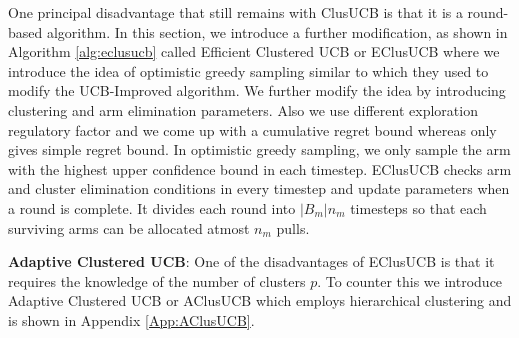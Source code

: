 One principal disadvantage that still remains with ClusUCB is that it is a round-based algorithm. %
In this section, we introduce a further modification,  as shown in Algorithm \ref{alg:eclusucb} called Efficient Clustered UCB or EClusUCB where we introduce the idea of optimistic greedy sampling similar to \cite{liu2016modification} which they used to modify the UCB-Improved algorithm. We further modify the idea by introducing clustering and arm elimination parameters. Also we use different exploration regulatory factor and we come up with a cumulative regret bound whereas  \cite{liu2016modification} only gives simple regret bound. In optimistic greedy sampling, we only sample the arm with the highest upper confidence bound in each timestep. EClusUCB checks arm and cluster elimination conditions in every timestep and update parameters when a round is complete. It divides each round into $|B_{m}|n_{m}$ timesteps so that each surviving arms can be allocated atmost $n_{m}$ pulls. 

\textbf{Adaptive Clustered UCB}: One of the disadvantages of EClusUCB is that it requires the knowledge of the number of clusters $p$. To counter this we introduce Adaptive Clustered UCB or AClusUCB which employs hierarchical clustering and is shown in Appendix \ref{App:AClusUCB}.
